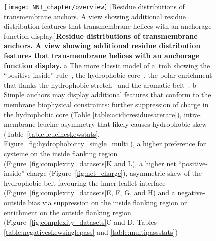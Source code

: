 \begin{figure}[!ht]
\centering
\texttt{[image: NNI\_chapter/overview]}
[Residue distributions of transmembrane anchors.
A view showing additional residue distribution features that transmembrane helices with an anchorage function display.]{\textbf{Residue distributions of transmembrane anchors.
A view showing additional residue distribution features that transmembrane helices with an anchorage function display.}
a The more classic model of a~\gls{tmh} showing the ``positive-inside'' rule~\cite{VonHeijne1989}, the hydrophobic core~\cite{Kyte1982}, the polar enrichment that flanks the hydrophobic stretch~\cite{Baeza-Delgado2013} and the aromatic belt~\cite{Granseth2005}.
b Simple anchors may display additional features that conform to the membrane biophysical constraints: further suppression of charge in the hydrophobic core (Table \ref{table:acidicresiduesarerare}), intra-membrane leucine asymmetry that likely causes hydrophobic skew~\cite{Sharpe2010} (Table~\ref{table:leucineskewstats}, Figure~\ref{fig:hydrophobicity_single_multi}), a higher preference for cysteine on the inside flanking region (Figure~\ref{fig:complexity_datasets}K and L), a higher net ``positive-inside'' charge (Figure~\ref{fig:net_charge}), asymmetric skew of the hydrophobic belt favouring the inner leaflet interface (Figure~\ref{fig:complexity_datasets}E, F, G, and H) and a negative-outside bias via suppression on the inside flanking region or enrichment on the outside flanking region (Figure~\ref{fig:complexity_datasets}C and D, Tables \ref{table:negativeskewsinglepass} and \ref{table:multipassstats})}


\label{fig:overview}
\end{figure}

